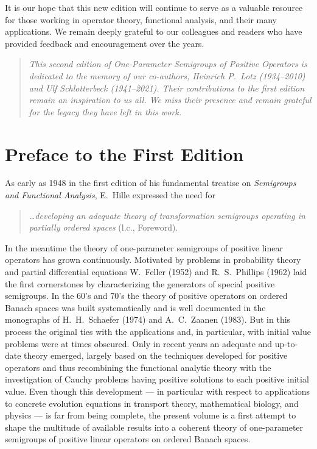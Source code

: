 	It is our hope that this new edition will continue to serve as a valuable resource for those working in operator theory, functional analysis, and their many applications. 
	We remain deeply grateful to our colleagues and readers who have provided feedback and encouragement over the years.
\begin{quote}
{\small\itshape
This second edition of \textit{One-Parameter Semigroups of Positive Operators} is dedicated to the memory 			of our co-authors, Heinrich P.~Lotz (1934--2010) and Ulf Schlotterbeck (1941--2021). 
Their contributions to the first edition remain an inspiration to us all. 
We miss their presence and remain grateful for the legacy they have left in this work.}
\end{quote}



\section*{Preface to the First Edition}

As early as 1948 in the first edition of his fundamental treatise on \emph{Semigroups and Functional Analysis}, E.~Hille expressed the need for 

\begin{quote}
\textit{\ldots developing an adequate theory of transformation semigroups operating in partially ordered spaces} (l.c., Foreword). 
\end{quote}

In the meantime the theory of one-parameter semigroups of positive linear operators has grown continuously. 
Motivated by problems in probability theory and partial differential equations W.~Feller (1952) and R.~S.~Phillips (1962) laid the first cornerstones by characterizing the generators of special positive semigroups. 
In the 60's and 70's the theory of positive operators on ordered Banach spaces was built systematically and is well documented in the monographs of H.~H.~Schaefer (1974) and A.~C.~Zaanen (1983). 
But in this process the original ties with the applications and, in particular, with initial value problems were at times obscured. 
Only in recent years an adequate and up-to-date theory emerged, largely based on the techniques developed for positive operators and thus recombining the functional analytic theory with the investigation of Cauchy problems having positive solutions to each positive initial value. 
Even though this development --- in particular with respect to applications to concrete evolution equations in transport theory, mathematical biology, and physics --- is far from being complete, the present volume is a first attempt to shape the multitude of available results into a coherent theory of one-parameter semigroups of positive linear operators on ordered Banach spaces.

